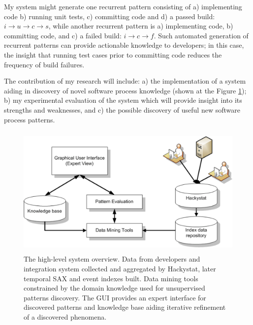 \documentclass[11pt,oneside]{article}
\begin{document}
My system might generate one recurrent pattern consisting of a) implementing code b) running unit tests, c) committing code and d) a passed build: $i \rightarrow u \rightarrow c \rightarrow s $, while another recurrent pattern is a) implementing code, b) committing code, and c) a failed build: $i \rightarrow c \rightarrow f $. Such automated generation of recurrent patterns can provide actionable knowledge to developers; in this case, the insight that running test cases prior to committing code reduces the frequency of build failures.

The contribution of my research will include: a) the implementation of a system aiding in discovery of novel software process knowledge (shown at the Figure \ref{fig:system_overview}); b) my experimental evaluation of the system which will provide insight into its strengths and weaknesses, and c) the possible discovery of useful new software process patterns.
\begin{figure}[tbp]
   \centering
   \includegraphics[height=65mm]{system_overview.eps}
   \caption{The high-level system overview. Data from developers and integration system collected and aggregated by Hackystat, later temporal SAX and event indexes built. Data mining tools constrained by the domain knowledge used for unsupervised patterns discovery. The GUI provides an expert interface for discovered patterns and knowledge base aiding iterative refinement of a discovered phenomena.}
   \label{fig:system_overview}
\end{figure}
\end{document}
